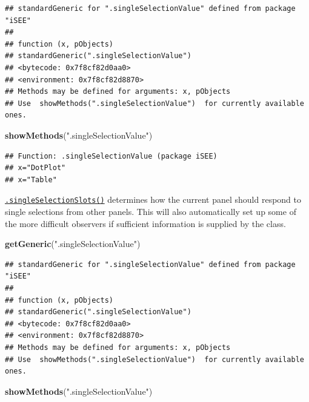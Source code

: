 \documentclass[
]{book}
\newenvironment{Shaded}{\begin{snugshade}}{\end{snugshade}}
\newcommand{\KeywordTok}[1]{\textcolor[rgb]{0.13,0.29,0.53}{\textbf{#1}}}
\newcommand{\NormalTok}[1]{#1}
\newcommand{\StringTok}[1]{\textcolor[rgb]{0.31,0.60,0.02}{#1}}
\begin{document}
\begin{verbatim}
## standardGeneric for ".singleSelectionValue" defined from package "iSEE"
## 
## function (x, pObjects) 
## standardGeneric(".singleSelectionValue")
## <bytecode: 0x7f8cf82d0aa0>
## <environment: 0x7f8cf82d8870>
## Methods may be defined for arguments: x, pObjects
## Use  showMethods(".singleSelectionValue")  for currently available ones.
\end{verbatim}

\begin{Shaded}
\begin{Highlighting}[]
\KeywordTok{showMethods}\NormalTok{(}\StringTok{".singleSelectionValue"}\NormalTok{)}
\end{Highlighting}
\end{Shaded}

\begin{verbatim}
## Function: .singleSelectionValue (package iSEE)
## x="DotPlot"
## x="Table"
\end{verbatim}

\href{https://isee.github.io/iSEE/reference/single-select-generics.html}{\texttt{.singleSelectionSlots()}} determines how the current panel should respond to single selections from other panels.
This will also automatically set up some of the more difficult observers if sufficient information is supplied by the class.

\begin{Shaded}
\begin{Highlighting}[]
\KeywordTok{getGeneric}\NormalTok{(}\StringTok{".singleSelectionValue"}\NormalTok{)}
\end{Highlighting}
\end{Shaded}

\begin{verbatim}
## standardGeneric for ".singleSelectionValue" defined from package "iSEE"
## 
## function (x, pObjects) 
## standardGeneric(".singleSelectionValue")
## <bytecode: 0x7f8cf82d0aa0>
## <environment: 0x7f8cf82d8870>
## Methods may be defined for arguments: x, pObjects
## Use  showMethods(".singleSelectionValue")  for currently available ones.
\end{verbatim}

\begin{Shaded}
\begin{Highlighting}[]
\KeywordTok{showMethods}\NormalTok{(}\StringTok{".singleSelectionValue"}\NormalTok{)}
\end{Highlighting}
\end{Shaded}
\end{document}
